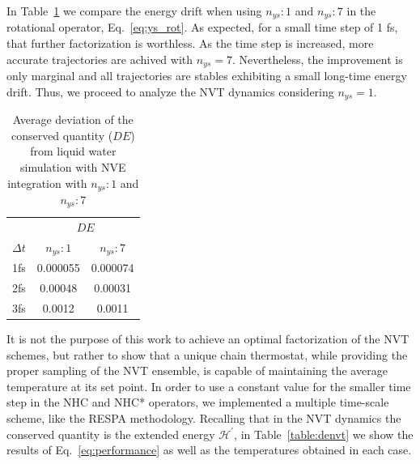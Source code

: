 \documentclass[aip,jcp,reprint,amsmath,amssymb]{revtex4-1}
\begin{document}
In Table~\ref{table:nve} we compare the energy drift when using $n_{ys}:1$ and $n_{ys}:7$ in the rotational operator, Eq.~\ref{eq:ys_rot}. As expected, for a small time step of 1 fs, that further factorization is worthless. As the time step is increased, more accurate trajectories are achived with $n_{ys} = 7 $. Nevertheless, the improvement is only marginal and all trajectories are stables exhibiting a small long-time energy drift. Thus, we proceed to analyze the NVT dynamics considering $n_{ys} = 1$.

\begin{table}[h]
\setlength{\tabcolsep}{7pt}
\caption{Average deviation of the conserved quantity ($DE$) from liquid water simulation with NVE integration with $n_{ys}:1$ and $n_{ys}:7$  }
\centering %
\begin{tabular}{| c  c  c |}  
\hline
&  \multicolumn{2}{c|}{ $D E$ }\\
\cline{2-3}
$\Delta t$ &$n_{ys}:1$ &$n_{ys}:7$ \\
\hline %
 1fs & 0.000055 & 0.000074\\
 2fs & 0.00048 & 0.00031 \\
 3fs & 0.0012 & 0.0011\\
 \hline
\end{tabular}
\label{table:nve}
\end{table}

It is not the purpose of this work to achieve an optimal factorization of the NVT schemes, but rather to show that a unique chain thermostat, while providing the proper sampling of the NVT ensemble, is capable of maintaining the average temperature at its set point. In order to use a constant value for the smaller time step in the NHC and NHC* operators, we implemented a multiple time-scale scheme, like the RESPA methodology\cite{Tuckerman1992}. Recalling that in the NVT dynamics the conserved quantity is the extended energy $\mathcal{H}^\prime$, in Table~\ref{table:denvt} we show the results of Eq.~\ref{eq:performance} as well as the temperatures obtained in each case.
\end{document}
